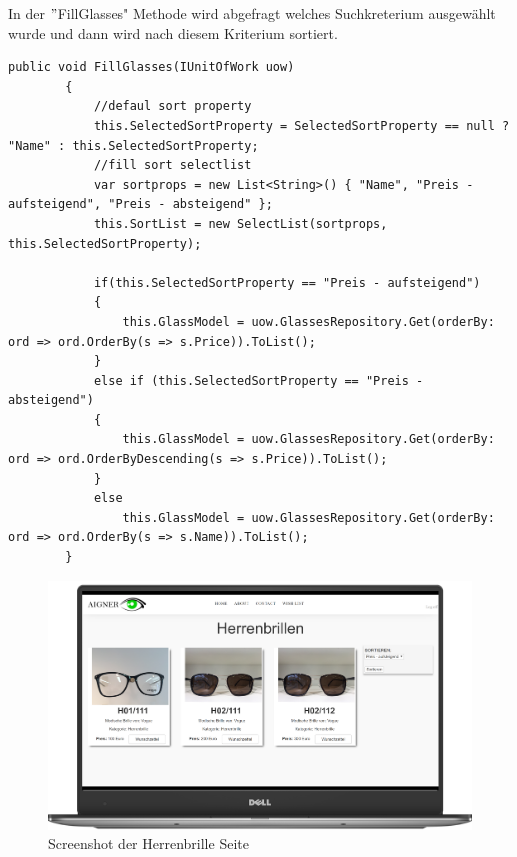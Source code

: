 In der $"$FillGlasses" Methode wird abgefragt welches Suchkreterium ausgewählt wurde und dann wird nach diesem Kriterium sortiert.
\begin{lstlisting}
public void FillGlasses(IUnitOfWork uow)
        {
            //defaul sort property
            this.SelectedSortProperty = SelectedSortProperty == null ? "Name" : this.SelectedSortProperty;
            //fill sort selectlist
            var sortprops = new List<String>() { "Name", "Preis - aufsteigend", "Preis - absteigend" };
            this.SortList = new SelectList(sortprops, this.SelectedSortProperty);

            if(this.SelectedSortProperty == "Preis - aufsteigend")
            {
                this.GlassModel = uow.GlassesRepository.Get(orderBy: ord => ord.OrderBy(s => s.Price)).ToList();
            }
            else if (this.SelectedSortProperty == "Preis - absteigend")
            {
                this.GlassModel = uow.GlassesRepository.Get(orderBy: ord => ord.OrderByDescending(s => s.Price)).ToList();
            }
            else
                this.GlassModel = uow.GlassesRepository.Get(orderBy: ord => ord.OrderBy(s => s.Name)).ToList();
        }
\end{lstlisting}
\begin{figure}[H]
\begin{center}
	\includegraphics[scale=.2]{images/Brillen.png}
\end{center}
	\caption{Screenshot der Herrenbrille Seite}
	\label{fig:sample}
\end{figure}


